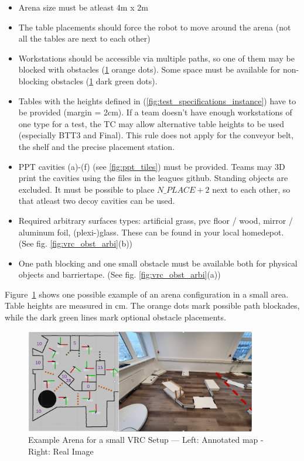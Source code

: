 \begin{itemize}
\item Arena size must be atleast 4m x 2m
\item The table placements should force the robot to move around the arena (not all the tables are next to each other)
\item Workstations should be accessible via multiple paths, so one of them may be blocked with obstacles (\ref{fig:vrc_arena_example} orange dots). Some space must be available for non-blocking obstacles (\ref{fig:vrc_arena_example} dark green dots).
\item Tables with the heights defined in (\ref{fig:test_specifications_instance}) have to be provided (margin = 2cm). If a team doesn't have enough workstations of one type for a test, the TC may allow alternative table heights to be used (especially BTT3 and Final). This rule does not apply for the conveyor belt, the shelf and the precise placement station.
\item PPT cavities (a)-(f) (see \ref{fig:ppt_tiles}) must be provided. Teams may 3D print the cavities using the files in the leagues github. Standing objects are excluded. It must be possible to place ${N\_PLACE + 2}$ next to each other, so that atleast two decoy cavities can be used. 
\item Required arbitrary surfaces types: artificial grass, pvc floor / wood, mirror / aluminum foil, (plexi-)glass. 
These can be found in your local homedepot. (See fig. \ref{fig:vrc_obst_arbi}(b))
\item One path blocking and one small obstacle must be available both for physical objects and barriertape. (See fig. \ref{fig:vrc_obst_arbi}(a))
\end{itemize}

Figure~\ref{fig:vrc_arena_example} shows one possible example of an arena configuration in a small area.
Table heights are measured in cm. 
The orange dots mark possible path blockades, while the dark green lines mark optional obstacle placements. 


\begin{figure}[h!]
\centering
\includegraphics[width=0.9\textwidth ]{./images/vrc_arena_example.png}
\caption{Example Arena for a small VRC Setup --- Left: Annotated map - Right: Real Image }
\label{fig:vrc_arena_example}
\end{figure}

